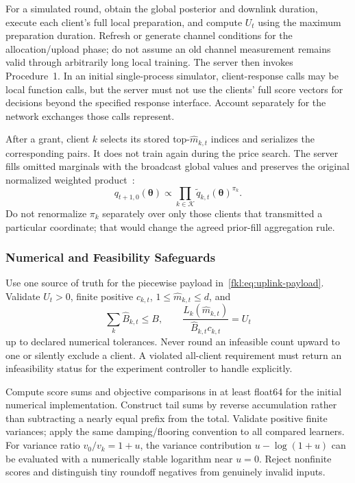 For a simulated round, obtain the global posterior and downlink duration, execute each client's full local preparation, and compute $U_t$ using the maximum preparation duration. Refresh or generate channel conditions for the allocation/upload phase; do not assume an old channel measurement remains valid through arbitrarily long local training. The server then invokes Procedure~1. In an initial single-process simulator, client-response calls may be local function calls, but the server must not use the clients' full score vectors for decisions beyond the specified response interface. Account separately for the network exchanges those calls represent.

After a grant, client $k$ selects its stored top-$\widehat m_{k,t}$ indices and serializes the corresponding pairs. It does not train again during the price search. The server fills omitted marginals with the broadcast global values and preserves the original normalized weighted product~\cite[Sec.~II-A]{fedkls}:
\begin{equation}
 q_{t+1,0}(\boldsymbol\theta)
 \propto\prod_{k\in\mathcal K}
 \widetilde q_{k,t}(\boldsymbol\theta)^{\pi_k}.
 \label{fkl:eq:aggregation}
\end{equation}
Do not renormalize $\pi_k$ separately over only those clients that transmitted a particular coordinate; that would change the agreed prior-fill aggregation rule.

\subsubsection{Numerical and Feasibility Safeguards}
Use one source of truth for the piecewise payload in~\eqref{fkl:eq:uplink-payload}. Validate $U_t>0$, finite positive $c_{k,t}$, $1\le\widehat m_{k,t}\le d$, and
\begin{equation}
 \sum_k\widehat B_{k,t}\le B,\qquad
 \frac{L_k(\widehat m_{k,t})}{\widehat B_{k,t}c_{k,t}}=U_t
 \label{fkl:eq:postconditions}
\end{equation}
up to declared numerical tolerances. Never round an infeasible count upward to one or silently exclude a client. A violated all-client requirement must return an infeasibility status for the experiment controller to handle explicitly.

Compute score sums and objective comparisons in at least float64 for the initial numerical implementation. Construct tail sums by reverse accumulation rather than subtracting a nearly equal prefix from the total. Validate positive finite variances; apply the same damping/flooring convention to all compared learners. For variance ratio $v_0/v_k=1+u$, the variance contribution $u-\log(1+u)$ can be evaluated with a numerically stable logarithm near $u=0$. Reject nonfinite scores and distinguish tiny roundoff negatives from genuinely invalid inputs.

